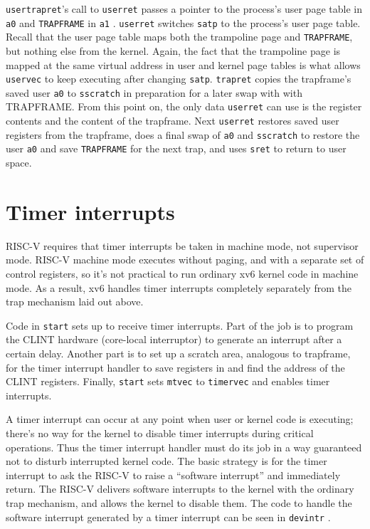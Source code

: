 {\tt usertrapret}'s call to {\tt userret} passes a pointer to the process's user
page table in {\tt a0} and {\tt TRAPFRAME} in {\tt a1}
.
{\tt userret} switches {\tt satp} to the process's user page table.
Recall that the user page table maps both the trampoline page
and {\tt TRAPFRAME}, but nothing else from the kernel.
Again, the fact that the trampoline page is mapped at the same
virtual address in user and kernel page tables is what allows
{\tt uservec} to keep executing after changing {\tt satp}.
{\tt trapret} copies the trapframe's saved user {\tt a0} to {\tt sscratch}
in preparation for a later swap with with TRAPFRAME.
From this point on, the only data {\tt userret} can use is
the register contents and the content of the trapframe.
Next {\tt userret} restores saved user registers from the trapframe,
does a final swap of {\tt a0} and {\tt sscratch} to restore the
user {\tt a0} and save {\tt TRAPFRAME} for the next trap,
and uses {\tt sret} to return to user space.

\section{Timer interrupts}

RISC-V requires that timer interrupts be taken in machine mode, not
supervisor mode. RISC-V machine mode executes without paging, and with
a separate set of control registers, so it's not practical to run
ordinary xv6 kernel code in machine mode. As a result, xv6 handles
timer interrupts completely separately from the trap mechanism laid out
above.

Code in {\tt start}
sets up to receive timer interrupts.
Part of the job is to program the CLINT hardware (core-local interruptor)
to generate an interrupt after a certain delay.
Another part is to set up a scratch area, analogous to trapframe,
for the timer interrupt handler to save registers in and find
the address of the CLINT registers.
Finally, {\tt start} sets {\tt mtvec} to {\tt timervec} and
enables timer interrupts.

A timer interrupt can occur at any point when user or kernel code is
executing; there's no way for the kernel to disable timer interrupts
during critical operations. Thus the timer interrupt handler must do
its job in a way guaranteed not to disturb interrupted kernel code.
The basic strategy is for the timer interrupt to ask the RISC-V to
raise a ``software interrupt'' and immediately return. The RISC-V
delivers software interrupts to the kernel with the ordinary trap
mechanism, and allows the kernel to disable them. The code to
handle the software interrupt generated by a timer interrupt can be
seen in {\tt devintr} .

